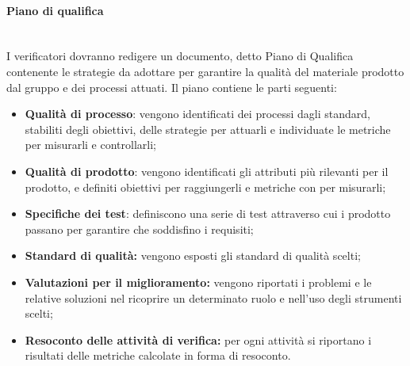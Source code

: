 		\paragraph{Piano di qualifica} \mbox{}\\
		I verificatori dovranno redigere un documento, detto Piano di Qualifica contenente le strategie da adottare per garantire la qualità del materiale prodotto dal gruppo e dei processi attuati. Il piano contiene le parti seguenti:
		\begin{itemize}
			\item \textbf{Qualità di processo}: vengono identificati dei processi dagli standard, stabiliti degli obiettivi, delle strategie per attuarli e individuate le metriche per misurarli e controllarli;
			\item \textbf{Qualità di prodotto}: vengono identificati gli attributi più rilevanti per il prodotto, e definiti obiettivi per raggiungerli e metriche con per misurarli;
			\item \textbf{Specifiche dei test}: definiscono una serie di test attraverso cui i prodotto passano per garantire che soddisfino i requisiti;
			\item \textbf{Standard di qualità:} vengono esposti gli standard di qualità scelti;
			\item \textbf{Valutazioni per il miglioramento:} vengono riportati i problemi e le relative soluzioni nel ricoprire un determinato ruolo e nell'uso degli strumenti scelti;
			\item \textbf{Resoconto delle attività di verifica:} per ogni attività si riportano i risultati delle metriche calcolate in forma di resoconto.
		\end{itemize}

     

